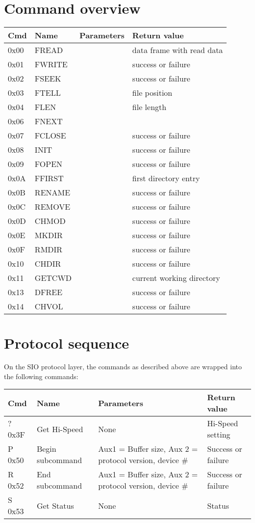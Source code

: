 \documentclass[10pt]{article}
\begin{document}
\section{Command overview}
\begin{tabular}[h!]{l|l|l|l}
Cmd & Name & Parameters & Return value \\ \hline
0x00 & FREAD & & data frame with read data \\
0x01 & FWRITE & & success or failure \\
0x02 & FSEEK & & success or failure \\
0x03 & FTELL & & file position \\
0x04 & FLEN & & file length \\
0x06 & FNEXT & & \\
0x07 & FCLOSE & & success or failure\\
0x08 & INIT & & success or failure \\
0x09 & FOPEN & & success or failure \\
0x0A & FFIRST & & first directory entry \\
0x0B & RENAME & & success or failure \\
0x0C & REMOVE & & success or failure \\
0x0D & CHMOD & & success or failure \\
0x0E & MKDIR & & success or failure \\
0x0F & RMDIR & & success or failure \\
0x10 & CHDIR & & success or failure \\
0x11 & GETCWD & & current working directory \\
0x13 & DFREE & & success or failure \\
0x14 & CHVOL & & success or failure 
\end{tabular}

\section{Protocol sequence}
On the SIO protocol layer, the commands as described above are wrapped into the following commands:

\begin{tabular}[h!]{l|l|l|l}
Cmd & Name & Parameters & Return value \\ \hline 
? 0x3F & Get Hi-Speed & None & Hi-Speed setting \\
P 0x50 & Begin subcommand & Aux1 = Buffer size, Aux 2 = protocol version, device \# & Success or failure \\
R 0x52 & End subcommand & Aux1 = Buffer size, Aux 2 = protocol version, device \# & Success or failure \\
S 0x53 & Get Status & None & Status 
\end{tabular}\\
\end{document}
